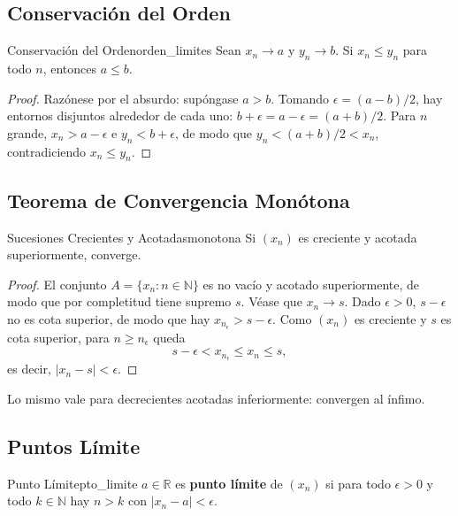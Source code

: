 \documentclass[11pt, a4paper]{article}
\begin{document}
\subsection{Conservación del Orden}

\begin{proposicion}{Conservación del Orden}{orden_limites}
Sean $x_n \to a$ y $y_n \to b$. Si $x_n \le y_n$ para todo $n$, entonces $a \le b$.
\end{proposicion}

\begin{proof}
Razónese por el absurdo: supóngase $a > b$. Tomando $\epsilon = (a-b)/2$, hay entornos disjuntos alrededor de
cada uno: $b + \epsilon = a - \epsilon = (a+b)/2$. Para $n$ grande, $x_n > a - \epsilon$ e
$y_n < b + \epsilon$, de modo que $y_n < (a+b)/2 < x_n$, contradiciendo $x_n \le y_n$.
\end{proof}

\subsection{Teorema de Convergencia Monótona}

\begin{teorema}{Sucesiones Crecientes y Acotadas}{monotona}
Si $(x_n)$ es creciente y acotada superiormente, converge.
\end{teorema}

\begin{proof}
El conjunto $A = \{x_n : n \in \mathbb{N}\}$ es no vacío y acotado superiormente, de modo que por
completitud tiene supremo $s$. Véase que $x_n \to s$. Dado $\epsilon > 0$, $s - \epsilon$ no es
cota superior, de modo que hay $x_{n_\epsilon} > s - \epsilon$. Como $(x_n)$ es creciente y $s$ es
cota superior, para $n \ge n_\epsilon$ queda
$$ s - \epsilon < x_{n_\epsilon} \le x_n \le s, $$
es decir, $|x_n - s| < \epsilon$.
\end{proof}

Lo mismo vale para decrecientes acotadas inferiormente: convergen al ínfimo.

\subsection{Puntos Límite}

\begin{definicion}{Punto Límite}{pto_limite}
$a \in \mathbb{R}$ es \textbf{punto límite} de $(x_n)$ si para todo $\epsilon > 0$ y todo
$k \in \mathbb{N}$ hay $n > k$ con $|x_n - a| < \epsilon$.
\end{definicion}
\end{document}
